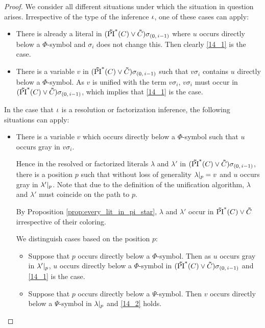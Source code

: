 \begin{proof}
	We consider all different situations under which the situation in question arises.
	Irrespective of the type of the inference $\iota$, one of these cases can apply:

	\begin{itemize}
		\item
			There is already a literal in $(\bm\tilde{\operatorname{PI}}^{*}(C)\lor \bm\tilde{C})\sigma_{(0,\,i-1)}$ where $u$ occurs directly below a $\Phi$-symbol and $\sigma_i$ does not change this.
			Then clearly \ref{14_1} is the case.

		\item
			There is a variable $v$ in $(\bm\tilde{\operatorname{PI}}^{*}(C)\lor \bm\tilde{C})\sigma_{(0,\,i-1)}$ such that $v\sigma_i$ contains $u$ directly below a $\Phi$-symbol.
			As $v$ is unified with the term $v\sigma_i$, $v\sigma_i$ must occur in $(\bm\tilde{\operatorname{PI}}^{*}(C)\lor \bm\tilde{C})\sigma_{(0,\,i-1)}$, which implies that \ref{14_1} is the case.

	\end{itemize}


	\noindent
	In the case that $\iota$ is a resolution or factorization inference, 
	the following situations can apply:

	\begin{itemize}
		\item
			There is a variable $v$ which occurs directly below a $\Phi$-symbol such that $u$ occurs gray in $v\sigma_i$.

			Hence in the resolved or factorized literals $\lambda$ and $\lambda'$ in $(\bm\tilde{\operatorname{PI}}^{*}(C)\lor \bm\tilde{C})\sigma_{(0,\,i-1)}$, there is a position $p$ such that without loss of generality $\lambda|_{p} = v$ and $u$ occurs gray in $\lambda'|_{p}$. 
			Note that due to the definition of the unification algorithm, $\lambda$ and $\lambda'$ must coincide on the path to $p$.

			By Proposition \ref{prop:every_lit_in_pi_star}, $\lambda$ and $\lambda'$ occur in $\bm\tilde{\operatorname{PI}}^{*}(C)\lor \bm\tilde{C}$ irrespective of their coloring.

			We distinguish cases based on the position $p$:

			\begin{itemize}
				\item Suppose that $p$ occurs directly below a $\Phi$-symbol.
					Then as $u$ occurs gray in  $\lambda'|_{p}$, $u$ occurs directly below a $\Phi$-symbol in $(\bm\tilde{\operatorname{PI}}^{*}(C)\lor \bm\tilde{C})\sigma_{(0,\,i-1)}$ and \ref{14_1} is the case.

				\item Suppose that $p$ occurs directly below a $\Psi$-symbol.
					Then $v$ occurs directly below a $\Psi$-symbol in $\lambda|_{p}$ and  \ref{14_2} holds.


\end{itemize}
\end{itemize}
\end{proof}
